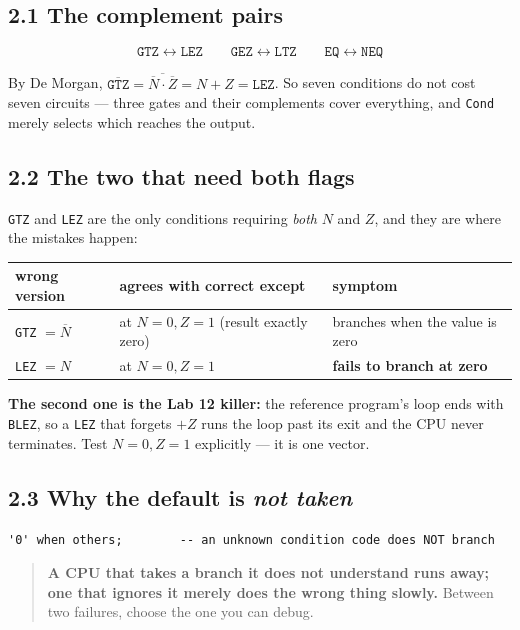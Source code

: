 \documentclass[11pt]{article}
\newcommand{\code}[1]{\texttt{#1}}
\begin{document}
\subsection*{2.1 The complement pairs}

\[
\code{GTZ} \leftrightarrow \code{LEZ} \qquad
\code{GEZ} \leftrightarrow \code{LTZ} \qquad
\code{EQ}  \leftrightarrow \code{NEQ}
\]

By De Morgan,
$\overline{\code{GTZ}} = \overline{\overline{N}\cdot\overline{Z}} = N + Z = \code{LEZ}$.
So seven conditions do not cost seven circuits --- three gates and their
complements cover everything, and \code{Cond} merely selects which reaches the
output.

\subsection*{2.2 The two that need both flags}

\code{GTZ} and \code{LEZ} are the only conditions requiring \emph{both} $N$ and
$Z$, and they are where the mistakes happen:

\begin{center}
\begin{tabular}{lll}
\toprule
wrong version & agrees with correct except & symptom \\
\midrule
\code{GTZ} $= \overline{N}$ & at $N{=}0, Z{=}1$ (result exactly zero) & branches when the value is zero \\
\code{LEZ} $= N$ & at $N{=}0, Z{=}1$ & \textbf{fails to branch at zero} \\
\bottomrule
\end{tabular}
\end{center}

\textbf{The second one is the Lab 12 killer:} the reference program's loop ends
with \code{BLEZ}, so a \code{LEZ} that forgets $+Z$ runs the loop past its exit
and the CPU never terminates. Test $N{=}0, Z{=}1$ explicitly --- it is one vector.

\subsection*{2.3 Why the default is \emph{not taken}}

\begin{lstlisting}
'0' when others;        -- an unknown condition code does NOT branch
\end{lstlisting}

\begin{quote}
\textbf{A CPU that takes a branch it does not understand runs away; one that
ignores it merely does the wrong thing slowly.} Between two failures, choose the
one you can debug.
\end{quote}
\end{document}
